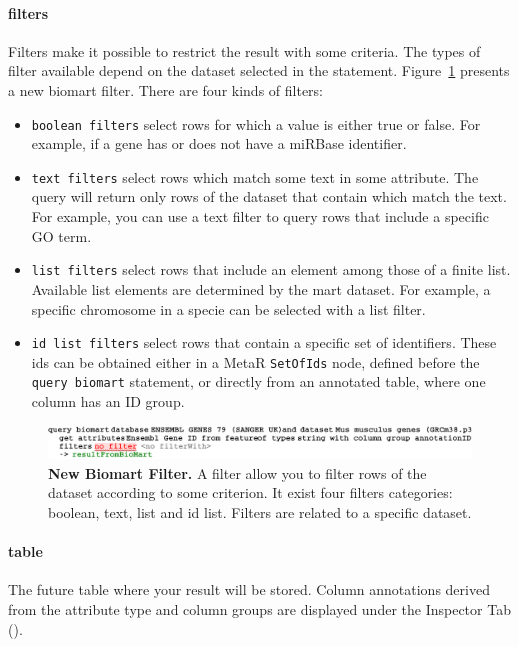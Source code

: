 \paragraph{filters}
Filters make it possible to restrict the result with some criteria. The types of filter available depend on the dataset selected in the statement. Figure~\ref{fig:BiomartFilter} presents a new biomart filter. There are four kinds of filters: 
\begin{itemize}

\item \texttt{boolean filters} select rows for which a value is either true or false. For example, if a gene has or does not have a miRBase identifier.
\item \texttt{text filters} select rows which match some text in some attribute. The query will return only rows of the dataset that contain which match the text. For example, you can use a text filter to query rows that include a specific GO term.
\item \texttt{list filters} select rows that include an element among those of a finite list. Available list elements are determined by the mart dataset.  For example, a specific chromosome in a specie can be selected with a list filter.
\item \texttt{id list filters} select rows that contain a specific set of identifiers. These ids can be obtained either in a MetaR \texttt{SetOfIds} node, defined before the \texttt{query biomart} statement, or directly from an annotated table, where one column has an ID group.  

\end{itemize}

 \begin{figure}[h!tbp]
  \centering
  \includegraphics[width=\figWidthWide]{figures/BiomartFilter.pdf}
\caption[New Biomart Filter]{\textbf{New Biomart Filter.} A filter allow you to filter rows of the dataset according to some criterion. It exist four filters categories: boolean, text, list and id list. Filters are related to a specific dataset.}
\label{fig:BiomartFilter}
\end{figure}

\paragraph{table}
The future table where your result will be stored. Column annotations derived from the attribute type and column groups are displayed under the Inspector Tab (\inspectorTabIcon).
